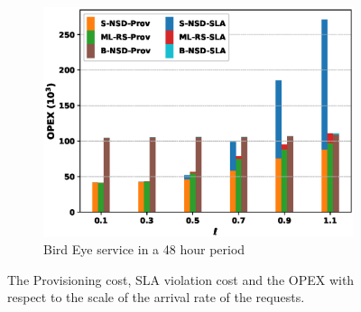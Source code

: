 \documentclass[conference, final]{IEEEtran}
\newcommand{\hlb}[2][blue]{{\color{#1} {#2}}\unskip }
\begin{document}
{\begin{figure}
\begin{subfigure}[h]{0.32\linewidth}
\includegraphics[width=\linewidth]{./figures/bird_eye-2days-bar.eps}
\caption{Bird Eye service in a 48 hour period}
\end{subfigure}
\caption{The Provisioning cost, SLA violation cost and the OPEX with respect to the scale of the arrival rate of the requests.}
\label{fig:opex}
\end{figure}

} %
\end{document}
